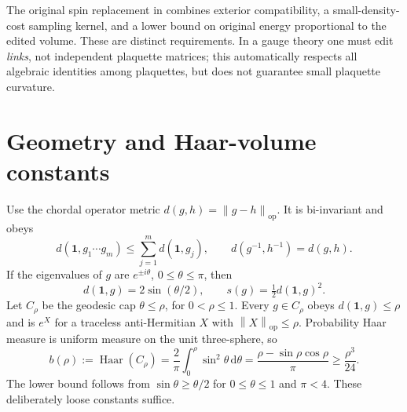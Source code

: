 \documentclass[11pt]{article}
\theoremstyle{definition}
\theoremstyle{remark}
\newcommand{\one}{\mathbf1}
\newcommand{\norm}[1]{\left\lVert#1\right\rVert}
\newcommand{\dd}{\,\mathrm d}
\begin{document}
The original spin replacement in \cite{repo-o3} combines exterior
compatibility, a small-density-cost sampling kernel, and a lower bound
on original energy proportional to the edited volume. These are distinct
requirements. In a gauge theory one must edit \emph{links}, not independent
plaquette matrices; this automatically respects all algebraic identities
among plaquettes, but does not guarantee small plaquette curvature.

\section{Geometry and Haar-volume constants}
Use the chordal operator metric
$d(g,h)=\norm{g-h}_{\mathrm{op}}$. It is bi-invariant and obeys
\[
 d(\one,g_1\cdots g_m)\le\sum_{j=1}^m d(\one,g_j),\qquad
 d(g^{-1},h^{-1})=d(g,h).
\]
If the eigenvalues of $g$ are $e^{\pm i\theta}$, $0\le\theta\le\pi$, then
\begin{equation}
 d(\one,g)=2\sin(\theta/2),\qquad
 s(g)=\tfrac12 d(\one,g)^2.\label{eq:energy-metric}
\end{equation}
Let $C_\rho$ be the geodesic cap $\theta\le\rho$, for $0<\rho\le1$.
Every $g\in C_\rho$ obeys $d(\one,g)\le\rho$ and is $e^X$ for a
traceless anti-Hermitian $X$ with $\norm X_{\mathrm{op}}\le\rho$.
Probability Haar measure is uniform measure on the unit three-sphere, so
\begin{equation}
 b(\rho):=\operatorname{Haar}(C_\rho)
 =\frac2\pi\int_0^\rho\sin^2\theta\dd\theta
 =\frac{\rho-\sin\rho\cos\rho}{\pi}
 \ge\frac{\rho^3}{24}.\label{eq:cap}
\end{equation}
The lower bound follows from $\sin\theta\ge\theta/2$ for
$0\le\theta\le1$ and $\pi<4$. These deliberately loose constants suffice.
\end{document}
